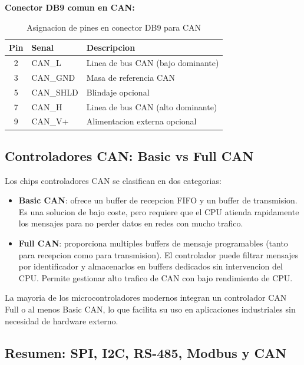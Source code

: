 \textbf{Conector DB9 comun en CAN:}

\begin{table}[H]
    \centering
    \caption{Asignacion de pines en conector DB9 para CAN}
    \label{tab:can_db9}
    \begin{tabular}{|c|l|l|}
        \hline
        \textbf{Pin} & \textbf{Senal} & \textbf{Descripcion} \\
        \hline
        2 & CAN\_L & Linea de bus CAN (bajo dominante) \\
        \hline
        3 & CAN\_GND & Masa de referencia CAN \\
        \hline
        5 & CAN\_SHLD & Blindaje opcional \\
        \hline
        7 & CAN\_H & Linea de bus CAN (alto dominante) \\
        \hline
        9 & CAN\_V+ & Alimentacion externa opcional \\
        \hline
    \end{tabular}
\end{table}

\subsection{Controladores CAN: Basic vs Full CAN}

Los chips controladores CAN se clasifican en dos categorias:

\begin{itemize}
    \item \textbf{Basic CAN}: ofrece un buffer de recepcion FIFO y un buffer de
    transmision. Es una solucion de bajo coste, pero requiere que el CPU atienda
    rapidamente los mensajes para no perder datos en redes con mucho trafico.
    \item \textbf{Full CAN}: proporciona multiples buffers de mensaje programables
    (tanto para recepcion como para transmision). El controlador puede filtrar
    mensajes por identificador y almacenarlos en buffers dedicados sin
    intervencion del CPU. Permite gestionar alto trafico de CAN con bajo
    rendimiento de CPU.
\end{itemize}

La mayoria de los microcontroladores modernos integran un controlador CAN Full
o al menos Basic CAN, lo que facilita su uso en aplicaciones industriales sin
necesidad de hardware externo.

\subsection{Resumen: SPI, I2C, RS-485, Modbus y CAN}

